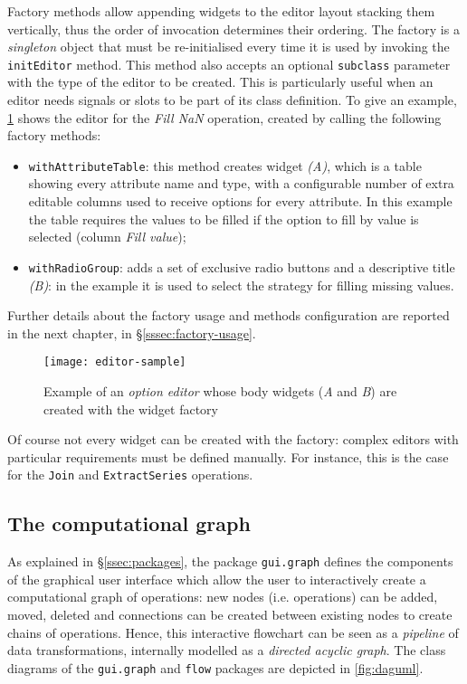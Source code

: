 Factory methods allow appending widgets to the editor layout stacking them vertically, thus the order of invocation determines their ordering. The factory is a \textit{singleton} object that must be re-initialised every time it is used by invoking the \texttt{initEditor} method. This method also accepts an optional \texttt{subclass} parameter with the type of the editor to be created. This is particularly useful when an editor needs signals or slots to be part of its class definition. To give an example, \cref{fig:editor_factory} shows the editor for the \textit{Fill NaN} operation, created by calling the following factory methods:
\begin{itemize}
	\item \texttt{withAttributeTable}: this method creates widget \textit{(A)}, which is a table showing every attribute name and type, with a configurable number of extra editable columns used to receive options for every attribute. In this example the table requires the values to be filled if the option to fill by value is selected (column \textit{Fill value});
	\item \texttt{withRadioGroup}: adds a set of exclusive radio buttons and a descriptive title \textit{(B)}: in the example it is used to select the strategy for filling missing values.
\end{itemize}
Further details about the factory usage and methods configuration are reported in the next chapter, in §\ref{sssec:factory-usage}.
\begin{figure}
	\centering
	\texttt{[image: editor-sample]}
	\caption[Example of an \textit{option editor} created with the widget factory]{Example of an \textit{option editor} whose body widgets (\textit{A} and \textit{B}) are created with the widget factory}
	\label{fig:editor_factory}
\end{figure}

Of course not every widget can be created with the factory: complex editors with particular requirements must be defined manually. For instance, this is the case for the \texttt{Join} and \texttt{ExtractSeries} operations.

\subsection{The computational graph}
As explained in §\ref{ssec:packages}, the package \texttt{gui.graph} defines the components of the graphical user interface which allow the user to interactively create a computational graph of operations: new nodes (i.e. operations) can be added, moved, deleted and connections can be created between existing nodes to create chains of operations. Hence, this interactive flowchart can be seen as a \textit{pipeline} of data transformations, internally modelled as a \textit{directed acyclic graph}. The class diagrams of the \texttt{gui.graph} and \texttt{flow} packages are depicted in \cref{fig:daguml}.

